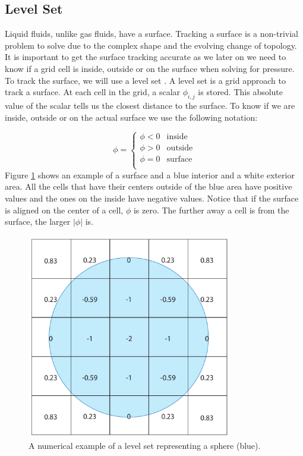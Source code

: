 \subsection{Level Set}

Liquid fluids, unlike gas fluids, have a surface. Tracking a surface is a non-trivial problem to solve due to the complex shape and the evolving change of topology. It is important to get the surface tracking accurate as we later on we need to know if a grid cell is inside, outside or on the surface when solving for pressure. To track the surface, we will use a level set \cite{osher}. A level set is a grid approach to track a surface. At each cell in the grid, a scalar $\phi_{i,j}$ is stored. This absolute value of the scalar tells us the closest distance to the surface. To know if we are inside, outside or on the actual surface we use the following notation:

\begin{equation}
\phi = 
\left\{
\begin{array}{ll}
\phi < 0 & \mbox{inside}  \\
\phi > 0 & \mbox{outside} \\
\phi = 0 & \mbox{surface} \\
\end{array}
\right.
\end{equation}
\noindent
Figure \ref{levetsetexample} shows an example of a surface and a blue interior and a white exterior area. All the cells that have their centers outside of the blue area have positive values and the ones on the inside have negative values. Notice that if the surface is aligned on the center of a cell, $\phi$ is zero.  The further away a cell is from the surface, the larger $| \phi| $ is. 

\begin{figure}[ht!]
\centering
\includegraphics[width=90mm]{img/levelset.pdf}
\caption{A numerical example of a level set representing a sphere (blue).}
\label{levetsetexample}
\end{figure}

